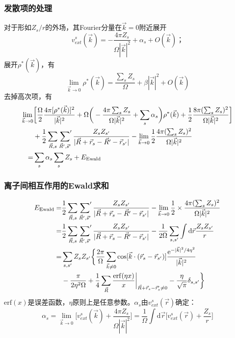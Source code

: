\documentclass[cjk,slidestop,compress,mathserif,blue]{beamer}
\begin{document}
\frame
{
	\frametitle{发散项的处理}
	对于形如$Z_s/r$的外场，其\textrm{Fourier}分量在$\vec k=0$附近展开
	\begin{displaymath}
		v_{ext}^s(\vec k)=-\dfrac{4\pi Z_s}{\Omega|\vec k|^2}+\alpha_s+O(\vec k)； 
	\end{displaymath}
	展开$\rho^{\ast}(\vec k)$，有
	\begin{displaymath}
		\lim_{\vec k\rightarrow 0}\rho^{\ast}(\vec k)=\dfrac{\sum_sZ_s}{\Omega}+\beta|\vec k|^2+O(\vec k)
	\end{displaymath}
去掉高次项，有
\begin{displaymath}
	\begin{aligned}
		\lim_{\vec k\rightarrow 0}&\bigg[\dfrac{\Omega}2\dfrac{4\pi[\rho^{\ast}(\vec k)]^2}{|\vec k|^2}+\Omega\bigg(-\dfrac{4\pi\sum_sZ_s}{\Omega|\vec k|^2}+\sum_s\alpha_s\bigg)\rho^{\ast}(\vec k)+\dfrac12\dfrac{8\pi(\sum_sZ_s)^2}{\Omega|\vec k|^2}\bigg]\\
		&+\dfrac12\sum_{\vec R,s}\sideset{}{^{\prime}}\sum_{\vec R^{\prime},\vec s^{\prime}}\dfrac{Z_sZ_{s^{\prime}}}{|\vec R+\vec r_s-\vec R^{\prime}-\vec r_{s^{\prime}}|}-\lim_{\vec k\rightarrow0}\dfrac12\dfrac{4\pi(\sum_sZ_s)^2}{\Omega|\vec k|^2}\\
		=&\sum_s\alpha_s\sum_sZ_s+E_{\mathrm{Ewald}}
	\end{aligned}
\end{displaymath}
}

\frame
{
	\frametitle{离子间相互作用的\textrm{Ewald}求和}
	\begin{displaymath}
		\begin{aligned}
			E_{\textrm{Ewald}}=&\dfrac12\sum_{\vec R,s}\sideset{}{^{\prime}}\sum_{\vec R^{\prime},\vec s^{\prime}}\dfrac{Z_sZ_{s^{\prime}}}{|\vec R+\vec r_s-\vec R^{\prime}-\vec r_{s^{\prime}}|}-\lim_{\vec k\rightarrow0}\dfrac12\times\dfrac{4\pi(\sum_sZ_s)^2}{\Omega|\vec k|^2}\\
			=&\dfrac12\sum_{\vec R,s}\sideset{}{^{\prime}}\sum_{\vec R^{\prime},\vec s^{\prime}}\dfrac{Z_sZ_{s^{\prime}}}{|\vec R+\vec r_s-\vec R^{\prime}-\vec r_{s^{\prime}}|}-\dfrac1{2\Omega}\sum_{s,s^{\prime}}\int\mathrm{d}\vec r\dfrac{Z_sZ_{s^{\prime}}}r\\
			=&\sum_{s,s^{\prime}}Z_sZ_{s^{\prime}}\bigg\{\dfrac{2\pi}{\Omega}\sum_{\vec k\neq 0}\cos[\vec k\cdot(\vec r_s-\vec r_{s^{\prime}})]\dfrac{\mathrm{e}^{-|\vec k|^2/4\eta^2}}{|\vec k|^2}\\
			&-\dfrac{\pi}{2\eta^2\Omega}+\dfrac14\sum_{\vec R}\dfrac{\mathrm{erf}(\eta x)}x\bigg|_{\vec R+\vec r_s-\vec r_s^{\prime}\neq0}-\dfrac{\eta}{\sqrt{\pi}}\delta_{s,s^{\prime}}\bigg\}
		\end{aligned}
	\end{displaymath}
	$\mathrm{erf}(x)$是误差函数，$\eta$原则上是任意参数。$\alpha_s$由$v_{ext}^s(\vec r)$确定：
	\begin{displaymath}
		\alpha_s=\lim_{\vec k\rightarrow0}\bigg[v_{ext}^s(\vec k)+\dfrac{4\pi Z_s}{\Omega|\vec k|^2}\bigg]=\dfrac1{\Omega}\int\mathrm{d}\vec r\bigg[v_{ext}^s(\vec r)+\dfrac{Z_s}r\bigg]
	\end{displaymath}
}
\end{document}
